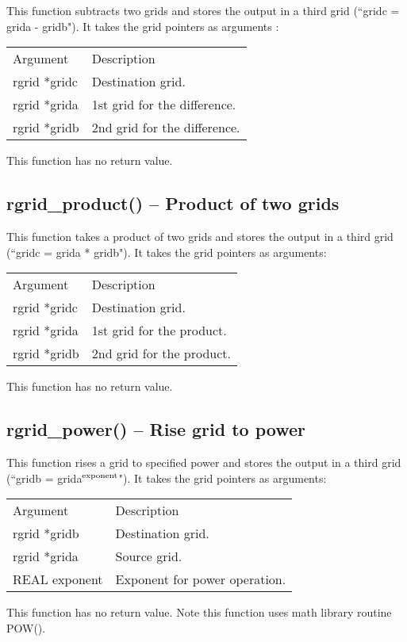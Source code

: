 \documentclass[12pt,letterpaper]{report}
\begin{document}
This function subtracts two grids and stores the output in a third grid (``gridc = grida - gridb"). It takes the grid pointers as arguments :
\begin{longtable}{p{} p{}}
Argument & Description\\
\cline{1-2}
rgrid *gridc & Destination grid.\\
rgrid *grida & 1st grid for the difference.\\
rgrid *gridb & 2nd grid for the difference.\\
\end{longtable}
\noindent
This function has no return value.

\subsection{rgrid\_product() -- Product of two grids}

This function takes a product of two grids and stores the output in a third grid (``gridc = grida * gridb"). It takes the grid pointers as arguments:
\begin{longtable}{p{} p{}}
Argument & Description\\
\cline{1-2}
rgrid *gridc & Destination grid.\\
rgrid *grida & 1st grid for the product.\\
rgrid *gridb & 2nd grid for the product.\\
\end{longtable}
\noindent
This function has no return value.

\subsection{rgrid\_power() -- Rise grid to power}

This function rises a grid to specified power and stores the output in a third grid (``gridb = grida$^\textnormal{exponent}$"). It takes the grid pointers as arguments:
\begin{longtable}{p{} p{}}
Argument & Description\\
\cline{1-2}
rgrid *gridb & Destination grid.\\
rgrid *grida & Source grid.\\
REAL exponent & Exponent for power operation.\\
\end{longtable}
\noindent
This function has no return value. Note this function uses math library routine POW().
\end{document}
